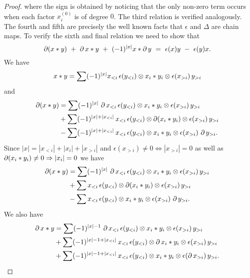 \begin{proof}
	where the sign is obtained by noticing that the only non-zero term occurs when each factor $x_i^{(0)}$ is of degree $0$.
	The third relation is verified analogously.
	The fourth and fifth are precisely the well known facts that $\epsilon$ and $\Delta$ are chain maps.
	To verify the sixth and final relation we need to show that
	\[
	\bd (x \ast y)\ +\ \bd x \ast y\ +\ (-1)^{|x|}x \ast \bd y\ =\ \epsilon(x) y \ -\ \epsilon(y) x.
	\]
	We have
	\[
	x \ast y = \sum (-1)^{|x|} x_{<i} \, \epsilon(y_{<i}) \otimes x_i \ast y_i \otimes \epsilon(x_{>i})\, y_{>i}
	\]
	and
	\begin{align*}
		\operatorname{\partial}(x \ast y) & =
		\sum (-1)^{|x|} \, \operatorname{\partial} x_{<i}\, \epsilon(y_{<i}) \otimes x_i \ast y_i \otimes \epsilon(x_{>i})\, y_{>i} \\ & +
		\sum (-1)^{|x|+|x_{<i}|} \, x_{<i}\, \epsilon(y_{<i}) \otimes \operatorname{\partial} (x_i \ast y_i) \otimes \epsilon(x_{>i}) \, y_{>i} \\ & -
		\sum (-1)^{|x|+|x_{<i}|} \, x_{<i}\, \epsilon(y_{<i}) \otimes x_i \ast y_i \otimes \epsilon(x_{>i})\, \operatorname{\partial} y_{>i}.
	\end{align*}
	Since $|x| = |x_{<i}| + |x_i| + |x_{>i}|$ and $\epsilon(x_{>i}) \neq 0 \Leftrightarrow |x_{>i}| = 0$ as well as $\operatorname{\partial}(x_i \ast y_i) \neq 0 \Rightarrow |x_i| = 0$
	we have
	\begin{equation} \label{e:boundary of product 1}
		\begin{split}
			\operatorname{\partial}(x \ast y) & =
			\sum (-1)^{|x|} \, \operatorname{\partial} x_{<i}\, \epsilon(y_{<i}) \otimes x_i \ast y_i \otimes \epsilon(x_{>i})\, y_{>i} \\ & +
			\sum x_{<i} \, \epsilon(y_{<i}) \otimes \operatorname{\partial} (x_i \ast y_i) \otimes \epsilon(x_{>i})\, y_{>i} \\ & -
			\sum x_{<i} \, \epsilon(y_{<i}) \otimes x_i \ast y_i \otimes \epsilon(x_{>i})\, \operatorname{\partial} y_{>i}.
		\end{split}
	\end{equation}
	We also have
	\begin{align*}
		\operatorname{\partial} x \ast y & =
		\sum (-1)^{|x|-1} \, \operatorname{\partial} x_{<i}\, \epsilon(y_{<i}) \otimes x_i \ast y_i \otimes \epsilon(x_{>i}) \, y_{>i} \\ & +
		\sum (-1)^{|x|-1+|x_{<i}|} \, x_{<i}\, \epsilon(y_{<i}) \otimes \operatorname{\partial} x_i \ast y_i \otimes \epsilon(x_{>i}) \, y_{>i} \\ & +
		\sum (-1)^{|x|-1+|x_{<i}|} \, x_{<i}\, \epsilon(y_{<i}) \otimes x_i \ast y_i \otimes \epsilon(\operatorname{\partial} x_{>i}) \, y_{>i}.
	\end{align*}

\end{proof}
